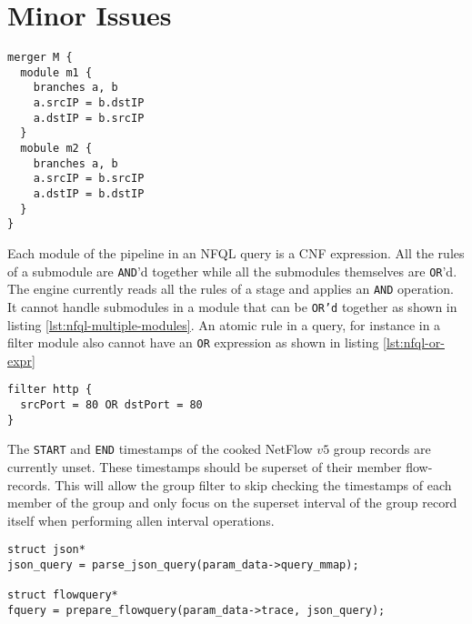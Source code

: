 \section{Minor Issues}\label{sec:minor-issues}

\begin{lstlisting}
merger M {
  module m1 {
    branches a, b
    a.srcIP = b.dstIP
    a.dstIP = b.srcIP
  }
  mobule m2 {
    branches a, b
    a.srcIP = b.srcIP
    a.dstIP = b.dstIP
  }
}
\end{lstlisting}

Each module of the pipeline in an \ac{NFQL} query is a \ac{CNF} expression.
All the rules of a submodule are \texttt{AND}'d together while all the
submodules themselves are \texttt{OR}'d. The engine currently reads all the
rules of a stage and applies an \texttt{AND}  operation. It cannot handle submodules in a module that can be
\texttt{OR'd} together as shown in listing \ref{lst:nfql-multiple-modules}. An
atomic rule in a query, for instance in a filter module also cannot have an
\texttt{OR} expression as shown in listing \ref{lst:nfql-or-expr}

\begin{lstlisting}
filter http {
  srcPort = 80 OR dstPort = 80
}
\end{lstlisting}

The \texttt{START} and \texttt{END} timestamps of the cooked NetFlow $v5$
group records are currently unset. These timestamps should be superset of
their member  flow-records.
This will allow the group filter to skip checking the timestamps of each
member of the group and only focus on the superset interval of the group
record itself when performing allen interval operations.

\begin{lstlisting}
struct json*
json_query = parse_json_query(param_data->query_mmap);

struct flowquery*
fquery = prepare_flowquery(param_data->trace, json_query);
\end{lstlisting}

